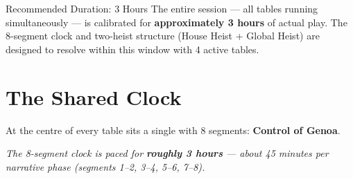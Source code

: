 
\begin{rulebox}[GoldRPG]{Recommended Duration: 3 Hours}
The entire session --- all tables running simultaneously --- is calibrated
for \textbf{approximately 3 hours} of actual play. The 8-segment clock and
two-heist structure (House Heist + Global Heist) are designed to resolve
within this window with 4 active tables.
\end{rulebox}

\section{The Shared Clock}
\label{sec:clock}


At the centre of every table sits a single 
with 8 segments: \textbf{Control of Genoa}.


\textit{\small The 8-segment clock is paced for \textbf{roughly 3 hours} ---
about 45 minutes per narrative phase (segments 1--2, 3--4, 5--6, 7--8).}

